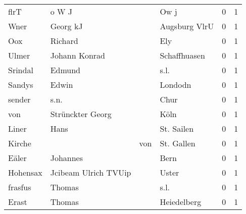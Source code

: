 \begin{tabular}{llllrr}
                     flrT &                              o W J &             &                                        Ow j &          0 &         1 \\
                     Wner &                           Georg kJ &             &                               Augsburg VlrU &          0 &         1 \\
                      Oox &                            Richard &             &                                         Ely &          0 &         1 \\
                    Ulmer &                      Johann Konrad &             &                                Schaffhuasen &          0 &         1 \\
                  Srindal &                             Edmund &             &                                        s.l. &          0 &         1 \\
                   Sandys &                              Edwin &             &                                     Londodn &          0 &         1 \\
                   sender &                               s.n. &             &                                        Chur &          0 &         1 \\
                      von &                   Strünckter Georg &             &                                        Köln &          0 &         1 \\
                    Liner &                               Hans &             &                                  St. Sailen &          0 &         1 \\
                   Kirche &                                    &         von &                                  St. Gallen &          0 &         1 \\
                    Eäler &                           Johannes &             &                                        Bern &          0 &         1 \\
                 Hohensax &               Jcibeam Ulrich TVUip &             &                                       Uster &          0 &         1 \\
                  frasfus &                             Thomas &             &                                        s.l. &          0 &         1 \\
                    Erast &                             Thomas &             &                                 Heiedelberg &          0 &         1 \\

\end{tabular}
